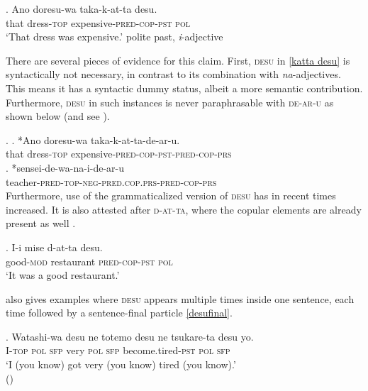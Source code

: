 \exg. Ano doresu-wa taka-k-at-ta desu.\\
that dress-\textsc{top} expensive-\textsc{pred-cop-pst} \textsc{pol}\\
`That dress was expensive.' \null \hfill polite past, \textit{i}-adjective \label{katta desu}

There are several pieces of evidence for this claim. First, \textsc{desu} in \ref{katta desu} is syntactically not necessary, in contrast to its combination with \textit{na}-adjectives. This means it has a syntactic dummy status, albeit a more semantic contribution. Furthermore, \textsc{desu} in such instances is never paraphrasable with \textsc{de-ar-u} as shown below (and see \citealt[10–11]{yamada:2023:looking}).

\ex. \ag. *Ano doresu-wa taka-k-at-ta-de-ar-u.\\
that dress-\textsc{top} expensive-\textsc{pred-cop-pst-pred-cop-prs}\\
\bg. *sensei-de-wa-na-i-de-ar-u\\
teacher-\textsc{pred-top-neg-pred.cop.prs-pred-cop-prs}\\

Furthermore, use of the grammaticalized version of \textsc{desu} has in recent times increased. It is also attested after \textsc{d-at-ta}, where the copular elements are already present as well \citep{yamada:2023:looking}.

\exg. I-i mise d-at-ta desu.\\
good-\textsc{mod} restaurant \textsc{pred-cop-pst} \textsc{pol}\\
`It was a good restaurant.’ \null \hfill \citep[13]{yamada:2023:looking} \label{desudatta}

\citet{yamada:2023:looking} also gives examples where \textsc{desu} appears multiple times inside one sentence, each time followed by a sentence-final particle \ref{desufinal}.

\exg. Watashi-wa desu ne totemo desu ne tsukare-ta desu yo.\\
I-\textsc{top} \textsc{pol} \textsc{sfp} very \textsc{pol} \textsc{sfp} become.tired-\textsc{pst} \textsc{pol} \textsc{sfp}\\
`I (you know) got very (you know) tired (you know).’ \\ \null \hfill (\citealt[Footnote 34]{yamada:2023:looking}) \label{desufinal}

